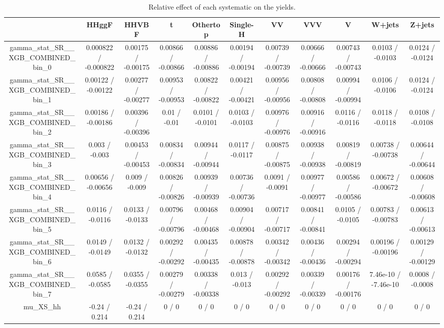 \documentclass[10pt]{article}
\begin{document}
\begin{table}[htbp]
\begin{center}
\begin{tabular}{|c|c|c|c|c|c|c|c|c|c|c|}
\hline 
      & HHggF      & HHVBF      & t      & Othertop      & Single-H      & VV      & VVV      & V      & W+jets      & Z+jets \\ 
\hline 
  gamma_stat_SR__XGB_COMBINED_bin_0 & 0.000822 / -0.000822 & 0.00175 / -0.00175 & 0.00866 / -0.00866 & 0.00886 / -0.00886 & 0.00194 / -0.00194 & 0.00739 / -0.00739 & 0.00666 / -0.00666 & 0.00743 / -0.00743 & 0.0103 / -0.0103 & 0.0124 / -0.0124 \\ 
  gamma_stat_SR__XGB_COMBINED_bin_1 & 0.00122 / -0.00122 & 0.00277 / -0.00277 & 0.00953 / -0.00953 & 0.00822 / -0.00822 & 0.00421 / -0.00421 & 0.00956 / -0.00956 & 0.00808 / -0.00808 & 0.00994 / -0.00994 & 0.0106 / -0.0106 & 0.0124 / -0.0124 \\ 
  gamma_stat_SR__XGB_COMBINED_bin_2 & 0.00186 / -0.00186 & 0.00396 / -0.00396 & 0.01 / -0.01 & 0.0101 / -0.0101 & 0.0103 / -0.0103 & 0.00976 / -0.00976 & 0.00916 / -0.00916 & 0.0116 / -0.0116 & 0.0118 / -0.0118 & 0.0108 / -0.0108 \\ 
  gamma_stat_SR__XGB_COMBINED_bin_3 & 0.003 / -0.003 & 0.00453 / -0.00453 & 0.00834 / -0.00834 & 0.00944 / -0.00944 & 0.0117 / -0.0117 & 0.00875 / -0.00875 & 0.00938 / -0.00938 & 0.00819 / -0.00819 & 0.00738 / -0.00738 & 0.00644 / -0.00644 \\ 
  gamma_stat_SR__XGB_COMBINED_bin_4 & 0.00656 / -0.00656 & 0.009 / -0.009 & 0.00826 / -0.00826 & 0.00939 / -0.00939 & 0.00736 / -0.00736 & 0.0091 / -0.0091 & 0.00977 / -0.00977 & 0.00586 / -0.00586 & 0.00672 / -0.00672 & 0.00608 / -0.00608 \\ 
  gamma_stat_SR__XGB_COMBINED_bin_5 & 0.0116 / -0.0116 & 0.0133 / -0.0133 & 0.00796 / -0.00796 & 0.00468 / -0.00468 & 0.00904 / -0.00904 & 0.00717 / -0.00717 & 0.00841 / -0.00841 & 0.0105 / -0.0105 & 0.00783 / -0.00783 & 0.00613 / -0.00613 \\ 
  gamma_stat_SR__XGB_COMBINED_bin_6 & 0.0149 / -0.0149 & 0.0132 / -0.0132 & 0.00292 / -0.00292 & 0.00435 / -0.00435 & 0.00878 / -0.00878 & 0.00342 / -0.00342 & 0.00436 / -0.00436 & 0.00294 / -0.00294 & 0.00196 / -0.00196 & 0.00129 / -0.00129 \\ 
  gamma_stat_SR__XGB_COMBINED_bin_7 & 0.0585 / -0.0585 & 0.0355 / -0.0355 & 0.00279 / -0.00279 & 0.00338 / -0.00338 & 0.013 / -0.013 & 0.00292 / -0.00292 & 0.00339 / -0.00339 & 0.00176 / -0.00176 & 7.46e-10 / -7.46e-10 & 0.0008 / -0.0008 \\ 
  mu_XS_hh & -0.24 / 0.214 & -0.24 / 0.214 & 0 / 0 & 0 / 0 & 0 / 0 & 0 / 0 & 0 / 0 & 0 / 0 & 0 / 0 & 0 / 0 \\ 
\hline 
\end{tabular} 
\caption{Relative effect of each systematic on the yields.} 
\end{center} 
\end{table} 
\end{document}
